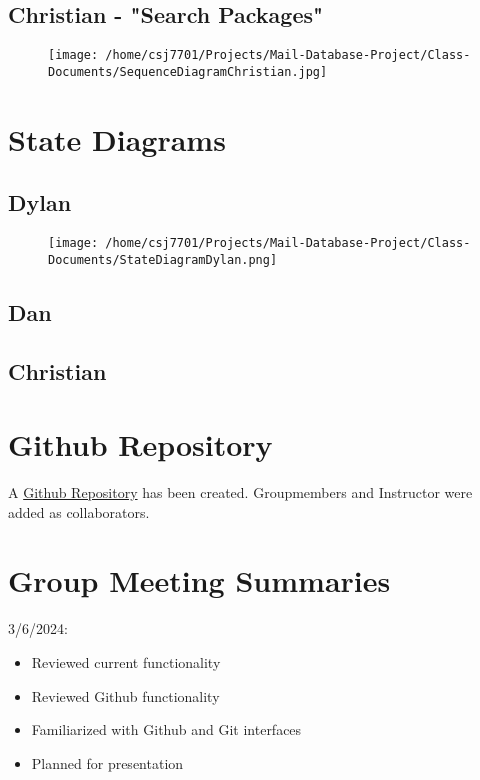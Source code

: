 \documentclass[11pt]{article}
\begin{document}
\subsection*{Christian - "Search Packages"}
\label{sec:org8cbbc42}
\begin{figure}[htbp]
\centering
\texttt{[image: /home/csj7701/Projects/Mail-Database-Project/Class-Documents/SequenceDiagramChristian.jpg]}
\bicaption{---}
\end{figure}
\section*{State Diagrams}
\label{sec:org90b4df1}

\subsection*{Dylan}
\label{sec:org24cc351}

\begin{figure}[htbp]
\centering
\texttt{[image: /home/csj7701/Projects/Mail-Database-Project/Class-Documents/StateDiagramDylan.png]}
\bicaption{---}
\end{figure}
\subsection*{Dan}
\label{sec:orga24fc5a}

\subsection*{Christian}
\label{sec:orgbc302f8}



\section*{Github Repository}
\label{sec:orgae18b9e}

A \href{https://github.com/CSJ7701/Mail-Database-Project}{Github Repository} has been created. Groupmembers and Instructor were added as collaborators.

\section*{Group Meeting Summaries}
\label{sec:org567001f}

3/6/2024:
\begin{itemize}
\item Reviewed current functionality
\item Reviewed Github functionality
\item Familiarized with Github and Git interfaces
\item Planned for presentation
\end{itemize}
\end{document}
